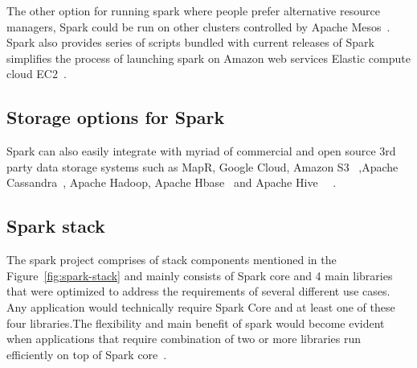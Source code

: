 The other option for running spark where people prefer alternative resource 
managers, Spark could be run on other clusters 
controlled by Apache Mesos~\cite{hid-sp18-410-mesos}.
Spark also provides series of scripts bundled with current releases of Spark 
simplifies the process of launching spark on Amazon web services Elastic 
compute cloud EC2~\cite{hid-sp18-410-spark-architecture}.

\subsection{Storage options for Spark}

Spark can also easily integrate with myriad of commercial and open source 3rd 
party data storage systems such as MapR, 
Google Cloud, Amazon S3~\cite{hid-sp18-410-s3}
,Apache Cassandra~\cite{hid-sp18-408-cassandra}, Apache Hadoop, 
Apache Hbase~\cite{hid-sp18-406-hbase} and 
Apache Hive~\cite{hid-sp18-410-hive}
~\cite{hid-sp18-410-spark-architecture}.


\subsection{Spark stack}


The spark project comprises of stack components mentioned in the 
Figure~\ref{fig:spark-stack} and mainly consists of Spark core and 
4 main libraries that were optimized to address the requirements 
of several different use cases.
Any application would technically require Spark Core and at least one of these 
four libraries.The flexibility and main benefit of spark would become evident 
when applications that require combination of two or more libraries run 
efficiently on top of Spark core~\cite{hid-sp18-410-spark-architecture}.





